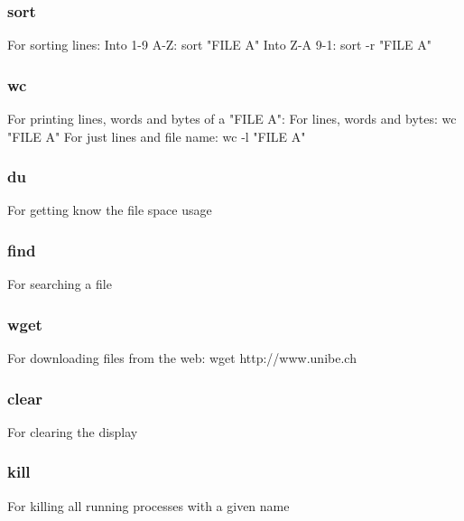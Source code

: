 \documentclass[10pt,a4paper]{scrartcl}
\begin{document}
\begin{description}
\subsubsection{sort}
\begin{terminalcode}
For sorting lines:
Into 1-9 A-Z: sort "FILE A"
Into Z-A 9-1: sort -r "FILE A"
\end{terminalcode}

\subsubsection{wc}
\begin{terminalcode}
For printing lines, words and bytes of a "FILE A":
For lines, words and bytes: wc "FILE A"
For just lines and file name: wc -l "FILE A"
\end{terminalcode}

\subsubsection{du}
\begin{terminalcode}
For getting know the file space usage
\end{terminalcode}

\subsubsection{find}
\begin{terminalcode}
For searching a file
\end{terminalcode}

\subsubsection{wget}
\begin{terminalcode}
For downloading files from the web: wget http://www.unibe.ch
\end{terminalcode}

\subsubsection{clear}
\begin{terminalcode}
For clearing the display
\end{terminalcode}

\subsubsection{kill}
\begin{terminalcode}
For killing all running processes with a given name
\end{terminalcode}


\end{description}
\end{document}
